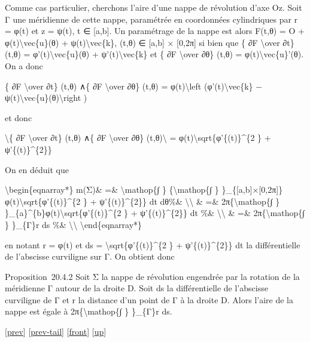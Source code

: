 \documentclass[]{article}
\begin{document}
Comme cas particulier, cherchons l'aire d'une nappe de révolution d'axe
Oz. Soit Γ une méridienne de cette nappe, paramétrée en coordonnées
cylindriques par r = φ(t) et z = ψ(t), t ∈ {[}a,b{]}. Un paramétrage de
la nappe est alors F(t,θ) = O + φ(t)\textbackslash{}vec\{u\}(θ) +
ψ(t)\textbackslash{}vec\{k\}, (t,θ) ∈ {[}a,b{]} × {[}0,2π{]} si bien que
\{ ∂F \textbackslash{}over ∂t\} (t,θ) = φ'(t)\textbackslash{}vec\{u\}(θ)
+ ψ'(t)\textbackslash{}vec\{k\} et \{ ∂F \textbackslash{}over ∂θ\} (t,θ)
= φ(t)\textbackslash{}vec\{u\}'(θ). On a donc

\{ ∂F \textbackslash{}over ∂t\} (t,θ) ∧\{ ∂F \textbackslash{}over ∂θ\}
(t,θ) = φ(t)\textbackslash{}left (φ'(t)\textbackslash{}vec\{k\} −
ψ(t)\textbackslash{}vec\{u\}(θ)\textbackslash{}right )

et donc

\textbackslash{}\textbar{}\{ ∂F \textbackslash{}over ∂t\} (t,θ) ∧\{ ∂F
\textbackslash{}over ∂θ\} (t,θ)\textbackslash{}\textbar{} =
\textbar{}φ(t)\textbar{}\textbackslash{}sqrt\{φ'\{(t)\}\^{}\{2 \} +
ψ'\{(t)\}\^{}\{2\}\}

On en déduit que

\textbackslash{}begin\{eqnarray*\} m(Σ)\& =\& \textbackslash{}mathop\{∫
\} \{\textbackslash{}mathop\{∫ \}
\}\_\{{[}a,b{]}×{[}0,2π{]}\}\textbar{}φ(t)\textbar{}\textbackslash{}sqrt\{φ'\{(t)\}\^{}\{2
\} + ψ'\{(t)\}\^{}\{2\}\} dt dθ\%\& \textbackslash{}\textbackslash{} \&
=\& 2π\{\textbackslash{}mathop\{∫ \}
\}\_\{a\}\^{}\{b\}\textbar{}φ(t)\textbar{}\textbackslash{}sqrt\{φ'\{(t)\}\^{}\{2
\} + ψ'\{(t)\}\^{}\{2\}\} dt \%\& \textbackslash{}\textbackslash{} \&
=\& 2π\{\textbackslash{}mathop\{∫ \} \}\_\{Γ\}\textbar{}r\textbar{} ds
\%\& \textbackslash{}\textbackslash{} \textbackslash{}end\{eqnarray*\}

en notant r = φ(t) et ds = \textbackslash{}sqrt\{φ'\{(t)\}\^{}\{2 \} +
ψ'\{(t)\}\^{}\{2\}\} dt la différentielle de l'abscisse curviligne sur
Γ. On obtient donc

Proposition~20.4.2 Soit Σ la nappe de révolution engendrée par la
rotation de la méridienne Γ autour de la droite D. Soit ds la
différentielle de l'abscisse curviligne de Γ et r la distance d'un point
de Γ à la droite D. Alors l'aire de la nappe est égale à
2π\{\textbackslash{}mathop\{∫ \} \}\_\{Γ\}r ds.

{[}\href{coursse106.html}{prev}{]}
{[}\href{coursse106.html\#tailcoursse106.html}{prev-tail}{]}
{[}\href{coursse107.html}{front}{]}
{[}\href{coursch21.html\#coursse107.html}{up}{]}
\end{document}
